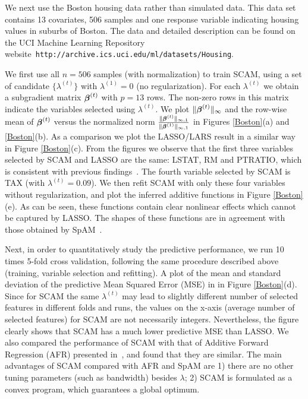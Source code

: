 
We next use the Boston housing data rather than simulated data. This data set
contains 13 covariates, 506 samples and one response variable
indicating housing values in suburbs of Boston. The data and detailed description
can be found on the UCI Machine Learning Repository website~\verb+http://archive.ics.uci.edu/ml/datasets/Housing+. 

We first use all $n=506$ samples (with normalization) to train SCAM, using
a set of candidate $\{\lambda^{(t)}\}$ with $\lambda^{(1)}=0$ (no regularization). For each $\lambda^{(t)}$
we obtain a subgradient matrix $\boldsymbol{\beta}^{(t)}$ with $p=13$ rows. The non-zero
rows in this matrix indicate the variables selected using $\lambda^{(t)}$. 
We plot $\|\boldsymbol{\beta}^{(t)}\|_{\infty}$ and the row-wise mean of $\boldsymbol{\beta}^{(t)}$ versus the normalized
norm $\frac{\|\boldsymbol{\beta}^{(t)}\|_{\infty,1}}{\|\boldsymbol{\beta}^{(1)}\|_{\infty,1}}$ in Figures \ref{Boston}(a) and \ref{Boston}(b).
As a comparison we plot the LASSO/LARS result in a similar way in Figure \ref{Boston}(c).
From the figures we observe that the first three variables selected by SCAM
and LASSO are the same: LSTAT, RM and PTRATIO, which is consistent with previous findings~\cite{SpAM:07}.
The fourth variable selected by SCAM is TAX (with $\lambda^{(t)}=0.09$).
We then refit SCAM with only these four variables without regularization, and plot the inferred additive
functions in Figure \ref{Boston}(e). As can be seen, these functions contain clear nonlinear effects which cannot be captured
by LASSO. The shapes of these functions are in agreement with those obtained by SpAM~\cite{SpAM:07}.

Next, in order to quantitatively study the predictive performance, we run 10 times 5-fold cross validation, following
the same procedure described above (training, variable selection and
refitting).  A plot of the mean and standard
deviation of the predictive Mean Squared Error (MSE) in in Figure \ref{Boston}(d). Since for SCAM the same $\lambda^{(t)}$ may lead to
slightly different number of selected features in different folds and runs, the values on the x-axis (average number of selected features)
for SCAM are not necessarily integers. Nevertheless, the figure clearly shows that SCAM has a much lower predictive MSE than LASSO. 
We also compared the performance of SCAM with that of Additive Forward Regression (AFR) presented in~\cite{Xi:09}, and found that they are similar.
The main advantages of SCAM compared with AFR and SpAM are 1) there are no other tuning parameters (such as bandwidth)
besides $\lambda$; 2) SCAM is formulated as a convex program, which guarantees a global optimum.

